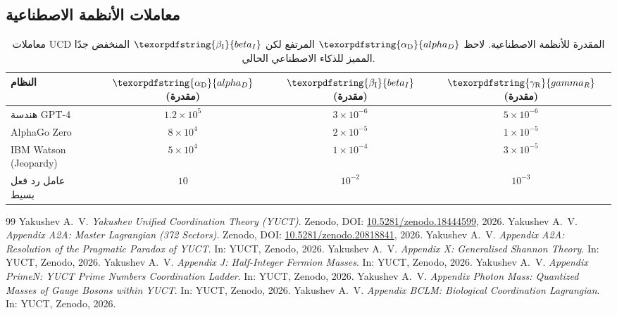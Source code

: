 \documentclass[12pt,a4paper]{article}
\DeclareRobustCommand{\alD}{\texorpdfstring{\ensuremath{\alpha_{\mathrm{D}}}}{alpha_D}}
\DeclareRobustCommand{\beI}{\texorpdfstring{\ensuremath{\beta_{\mathrm{I}}}}{beta_I}}
\DeclareRobustCommand{\gaR}{\texorpdfstring{\ensuremath{\gamma_{\mathrm{R}}}}{gamma_R}}
\begin{document}
	\subsection{معاملات الأنظمة الاصطناعية}
	
	\begin{table}[ht]
		\centering
		\begin{tabular}{lccc}
			\toprule
			\textbf{النظام} & \(\alD\) (مقدرة) & \(\beI\) (مقدرة) & \(\gaR\) (مقدرة) \\
			\midrule
			هندسة GPT-4 & \(1.2 \times 10^5\) & \(3 \times 10^{-6}\) & \(5 \times 10^{-6}\) \\
			AlphaGo Zero & \(8 \times 10^4\) & \(2 \times 10^{-5}\) & \(1 \times 10^{-5}\) \\
			IBM Watson (Jeopardy) & \(5 \times 10^4\) & \(1 \times 10^{-4}\) & \(3 \times 10^{-5}\) \\
			عامل رد فعل بسيط & \(10\) & \(10^{-2}\) & \(10^{-3}\) \\
			\bottomrule
		\end{tabular}
		\caption{معاملات UCD المقدرة للأنظمة الاصطناعية. لاحظ \(\alD\) المرتفع لكن \(\beI\) المنخفض جدًا المميز للذكاء الاصطناعي الحالي.}
		\label{tab:ai-measurements}
	\end{table}
	
	\begin{thebibliography}{99}
		Yakushev A.~V. \emph{Yakushev Unified Coordination Theory (YUCT)}. Zenodo, DOI: \href{https://doi.org/10.5281/zenodo.18444599}{10.5281/zenodo.18444599}, 2026.
		Yakushev A.~V. \emph{Appendix A2A: Master Lagrangian (372 Sectors)}. Zenodo, DOI: \href{https://doi.org/10.5281/zenodo.20818841}{10.5281/zenodo.20818841}, 2026.
		Yakushev A.~V. \emph{Appendix A2A: Resolution of the Pragmatic Paradox of YUCT}. In: YUCT, Zenodo, 2026.
		Yakushev A.~V. \emph{Appendix X: Generalised Shannon Theory}. In: YUCT, Zenodo, 2026.
		Yakushev A.~V. \emph{Appendix J: Half-Integer Fermion Masses}. In: YUCT, Zenodo, 2026.
		Yakushev A.~V. \emph{Appendix PrimeN: YUCT Prime Numbers Coordination Ladder}. In: YUCT, Zenodo, 2026.
		Yakushev A.~V. \emph{Appendix Photon Mass: Quantized Masses of Gauge Bosons within YUCT}. In: YUCT, Zenodo, 2026.
		Yakushev A.~V. \emph{Appendix BCLM: Biological Coordination Lagrangian}. In: YUCT, Zenodo, 2026.
	\end{thebibliography}
	
\end{document}
